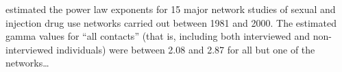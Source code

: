 \textcite{rothenberg2007large} estimated the power law exponents for 15 major
network studies of sexual and injection drug use networks carried out between
1981 and 2000. The estimated \gls{gamma} values for ``all contacts'' (that is,
including both interviewed and non-interviewed individuals) were 
between 2.08 and 2.87 for all but one of the networks\ldots


